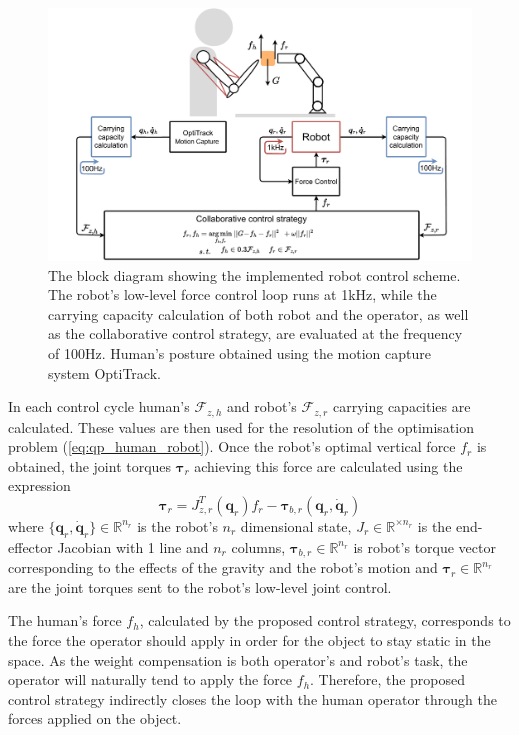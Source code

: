 \begin{figure}[!htb]
    \centering
    \includegraphics[width=\linewidth]{Papers/images/schema_human_robot.pdf}
    \caption{The block diagram showing the implemented robot control scheme. The robot's low-level force control loop runs at 1kHz, while the carrying capacity calculation of both robot and the operator, as well as the collaborative control strategy, are evaluated at the frequency of 100Hz. Human's posture obtained using the motion capture system OptiTrack.}
    \label{fig:schema_human_robot_control}
\end{figure}

In each control cycle human's $\mathcal{F}_{z,h}$ and robot's $\mathcal{F}_{z,r}$ carrying capacities are calculated. These values are then used for the resolution of the optimisation problem (\ref{eq:qp_human_robot}). Once the robot's optimal vertical force $f_{r}$ is obtained, the joint torques $\bm{\tau}_{r}$ achieving this force are calculated using the expression
$$
\bm{\tau}_r = J_{z,r}^T(\bm{q}_r) f_r - \bm{\tau}_{b,r}(\bm{q}_r,\dot{\bm{q}}_r)
$$
where $\{\bm{q}_r,\dot{\bm{q}}_r\}\in \mathbb{R}^{n_r}$ is the robot's $n_r$ dimensional state, $J_r\in\mathbb{R}^{\times n_r}$ is the end-effector Jacobian with 1 line and $n_r$ columns, $\bm{\tau}_{b,r} \in\mathbb{R}^{n_r}$ is robot's torque vector corresponding to the effects of the gravity and the robot's motion and $\bm{\tau}_r \in\mathbb{R}^{n_r}$ are the joint torques sent to the robot's low-level joint control. 

The human's force $f_h$, calculated by the proposed control strategy, corresponds to the force the operator should apply in order for the object to stay static in the space. As the weight compensation is both operator's and robot's task, the operator will naturally tend to apply the force $f_h$. 
Therefore, the proposed control strategy indirectly closes the loop with the human operator through the forces applied on the object.

